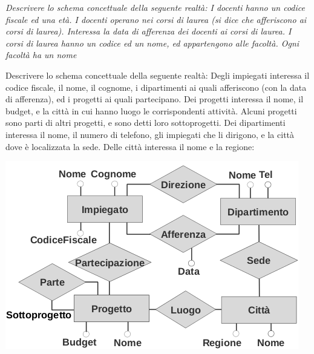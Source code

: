 \documentclass[a4paper,12pt, oneside]{book}
\begin{document}
\newpage
\textit{Descrivere lo schema concettuale della seguente
realtà:
I docenti hanno un codice fiscale ed una età. I
docenti operano nei corsi di laurea (si dice che
afferiscono ai corsi di laurea). Interessa la data di
afferenza dei docenti ai corsi di laurea. I corsi di
laurea hanno un codice ed un nome, ed
appartengono alle facoltà. Ogni facoltà ha un nome}
\begin{center}
\end{center}
\newpage
\begin{esempio}
Descrivere lo schema concettuale della seguente
realtà:
Degli impiegati interessa il codice fiscale, il nome, il
cognome, i dipartimenti ai quali afferiscono (con la
data di afferenza), ed i progetti ai quali partecipano.
Dei progetti interessa il nome, il budget, e la città in
cui hanno luogo le corrispondenti attività. Alcuni
progetti sono parti di altri progetti, e sono detti loro
sottoprogetti. Dei dipartimenti interessa il nome, il
numero di telefono, gli impiegati che li dirigono, e la
città dove è localizzata la sede. Delle città interessa
il nome e la regione:
\begin{center}
\includegraphics[scale=3]{img/er.png}
\end{center}
\end{esempio}
\end{document}
